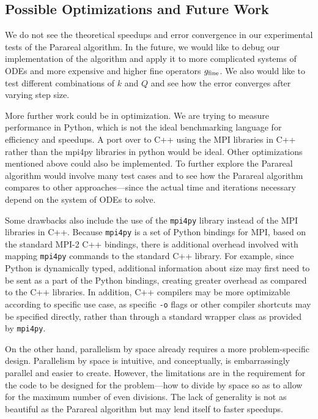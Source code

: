 \documentclass[letterpaper,12pt]{article}
\begin{document}
\subsection{Possible Optimizations and Future Work}

We do not see the theoretical speedups and error convergence in our experimental
tests of the Parareal algorithm. In the future, we would like to debug our
implementation of the algorithm and apply it to more complicated systems of ODEs
and more expensive and higher fine operators $g_{\textnormal{fine}}$. We also
would like to test different combinations of $k$ and $Q$ and see how the error
converges after varying step size. 

More further work could be in optimization. We are trying to measure performance
in Python, which is not the ideal benchmarking language for efficiency and
speedups. A port over to C++ using the MPI libraries in C++ rather than the
mpi4py libraries in python would be ideal. Other optimizations mentioned above
could also be implemented. To further explore the Parareal algorithm would
involve many test cases and to see how the Parareal algorithm compares to other
approaches---since the actual time and iterations necessary depend on the system
of ODEs to solve.

Some drawbacks also include the use of the \verb|mpi4py| library instead of the MPI libraries in C++. Because \verb|mpi4py| is a set of Python bindings for MPI, based on the standard MPI-2 C++ bindings, there is additional overhead involved with mapping \verb|mpi4py| commands to the standard C++ library. For example, since Python is dynamically typed, additional information about size may first need to be sent as a part of the Python bindings, creating greater overhead as compared to the C++ libraries. In addition, C++ compilers may be more optimizable according to specific use case, as specific \verb|-o| flags or other compiler shortcuts may be specified directly, rather than through a standard wrapper class as provided by \verb|mpi4py|.

On the other hand, parallelism by space already requires a more problem-specific
design. Parallelism by space is intuitive, and conceptually, is embarrassingly parallel and easier to create. However, the
limitations are in the requirement for the code to be designed for the
problem---how to divide by space so as to allow for the maximum number of even
divisions. The lack of generality is not as beautiful as the Parareal algorithm
but may lend itself to faster speedups.
\end{document}
